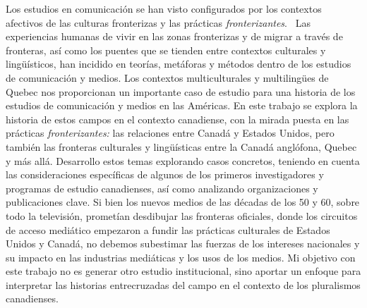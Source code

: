 \documentclass{tufte-handout}
\begin{document}
\begin{titlepage}
Los estudios en comunicación se han visto configurados por los contextos
afectivos de las culturas fronterizas y las prácticas
\emph{fronterizantes}. ~Las experiencias humanas de vivir en las zonas
fronterizas y de migrar a través de fronteras, así como los puentes que
se tienden entre contextos culturales y lingüísticos, han incidido en
teorías, metáforas y métodos dentro de los estudios de comunicación y
medios. Los contextos multiculturales y multilingües de Quebec nos
proporcionan un importante caso de estudio para una historia de los
estudios de comunicación y medios en las Américas. En este trabajo se
explora la historia de estos campos en el contexto canadiense, con la
mirada puesta en las prácticas \emph{fronterizantes:} las relaciones
entre Canadá y Estados Unidos, pero también las fronteras culturales y
lingüísticas entre la Canadá anglófona, Quebec y más allá. Desarrollo
estos temas explorando casos concretos, teniendo en cuenta las
consideraciones específicas de algunos de los primeros investigadores y
programas de estudio canadienses, así como analizando organizaciones y
publicaciones clave. Si bien los nuevos medios de las décadas de los 50
y 60, sobre todo la televisión, prometían desdibujar las fronteras
oficiales, donde los circuitos de acceso mediático empezaron a fundir
las prácticas culturales de Estados Unidos y Canadá, no debemos
subestimar las fuerzas de los intereses nacionales y su impacto en las
industrias mediáticas y los usos de los medios. Mi objetivo con este
trabajo no es generar otro estudio institucional, sino aportar un
enfoque para interpretar las historias entrecruzadas del campo en el
contexto de los pluralismos canadienses.




 \end{titlepage}

\end{document}
